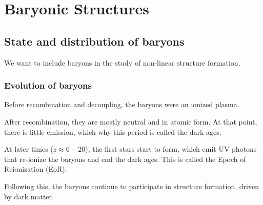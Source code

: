\chapter{Baryonic Structures}


\section{State and distribution of baryons}


We want to include baryons in the study of non-linear structure formation.


\subsection{Evolution of baryons}
Before recombination and decoupling, the baryons were an ionized plasma.

After recombination, they are mostly neutral and in atomic form. At that point, there is little emission, which why this period is called the dark ages.

At later times ($z \approx 6$ -- $20$), the first stars start to form, which emit UV photons that re-ionize the baryons and end the dark ages. This is called the Epoch of Reionization (EoR).

Following this, the baryons continue to participate in structure formation, driven by dark matter.